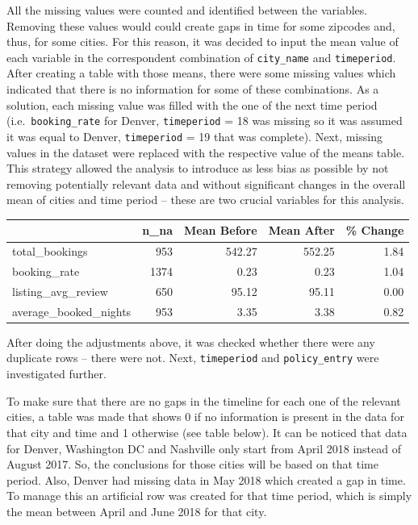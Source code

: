 \documentclass[
  12pt,
]{article}
\begin{document}
All the missing values were counted and identified between the
variables. Removing these values would could create gaps in time for
some zipcodes and, thus, for some cities. For this reason, it was
decided to input the mean value of each variable in the correspondent
combination of \texttt{city\_name} and \texttt{timeperiod}. After
creating a table with those means, there were some missing values which
indicated that there is no information for some of these combinations.
As a solution, each missing value was filled with the one of the next
time period (i.e.~\texttt{booking\_rate} for Denver, \texttt{timeperiod}
= 18 was missing so it was assumed it was equal to Denver,
\texttt{timeperiod} = 19 that was complete). Next, missing values in the
dataset were replaced with the respective value of the means table. This
strategy allowed the analysis to introduce as less bias as possible by
not removing potentially relevant data and without significant changes
in the overall mean of cities and time period -- these are two crucial
variables for this analysis.

\begin{longtable}[]{@{}lrrrr@{}}
\toprule\noalign{}
& n\_na & Mean Before & Mean After & \% Change \\
\midrule\noalign{}
\endhead
\bottomrule\noalign{}
\endlastfoot
total\_bookings & 953 & 542.27 & 552.25 & 1.84 \\
booking\_rate & 1374 & 0.23 & 0.23 & 1.04 \\
listing\_avg\_review & 650 & 95.12 & 95.11 & 0.00 \\
average\_booked\_nights & 953 & 3.35 & 3.38 & 0.82 \\
\end{longtable}

After doing the adjustments above, it was checked whether there were any
duplicate rows -- there were not. Next, \texttt{timeperiod} and
\texttt{policy\_entry} were investigated further.

To make sure that there are no gaps in the timeline for each one of the
relevant cities, a table was made that shows 0 if no information is
present in the data for that city and time and 1 otherwise (see table
below). It can be noticed that data for Denver, Washington DC and
Nashville only start from April 2018 instead of August 2017. So, the
conclusions for those cities will be based on that time period. Also,
Denver had missing data in May 2018 which created a gap in time. To
manage this an artificial row was created for that time period, which is
simply the mean between April and June 2018 for that city.
\end{document}
